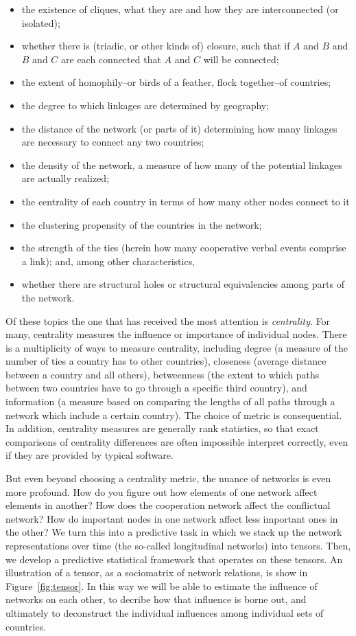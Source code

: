 \documentclass[12pt,oneside,doublespace,pdflatex]{amsart}
\begin{document}
\begin{itemize}
\item the existence of cliques, what they are and how they are interconnected (or isolated);
\item whether there is (triadic, or other kinds of) closure, such that if $A$ and $B$ and $B$ and $C$ are each connected that
$A$ and $C$ will be connected;
\item the extent of homophily--or birds of a feather, flock together--of countries;
\item the degree to which linkages are determined by geography;
\item the distance of the network (or parts of it) determining how many linkages are necessary to connect any two countries;
\item the density of the network, a measure of how many of the potential linkages are actually realized;
\item the centrality of each country in terms of how many other nodes connect to it
\item the clustering propensity of the countries in the network;
\item the strength of the ties (herein how many cooperative verbal events comprise a link); and, among other characteristics,
\item whether there are structural holes or structural equivalencies among parts of the network.
\end{itemize}

Of these topics the one that has received the most attention is {\em centrality}. For many, centrality measures the influence or importance of individual nodes.  There is a multiplicity of ways to measure centrality, including degree (a measure of the number of ties a country has to other countries), closeness (average distance between a country and all others), betweenness (the extent to which paths between two countries have to go through a specific third country), and information (a measure based on comparing the lengths of all paths through a network which include a certain country). The choice of metric is consequential. In addition, centrality measures are generally rank statistics, so that exact comparisons of centrality differences are often impossible interpret correctly, even if they are provided by typical software.

But even beyond choosing a centrality metric, the nuance of networks is even more profound.  How do you figure out how elements of one network affect elements in another? How does the cooperation network affect the conflictual network? How do important nodes in one network affect less important ones in the other?  We turn this into a predictive task in which we stack up the network representations over time (the so-called longitudinal networks) into tensors.  Then, we develop a predictive statistical framework that operates on these tensors.  An illustration of a tensor, as a sociomatrix of network relations, is show in Figure~\ref{fig:tensor}. In this way we will be able to estimate the influence of networks on each other, to decribe how that influence is borne out, and ultimately to deconstruct the individual influences among individual sets of countries.
\end{document}
